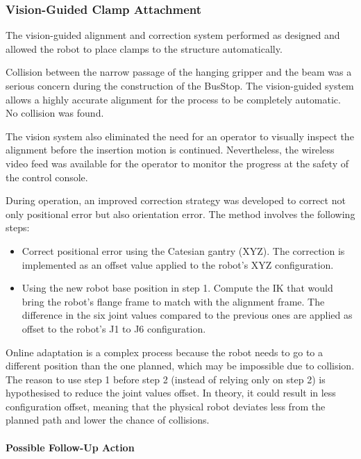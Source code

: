 \subsubsection{Vision-Guided Clamp Attachment}

The vision-guided alignment and correction system performed as designed and allowed the robot to place clamps to the structure automatically. 

Collision between the narrow passage of the hanging gripper and the beam was a serious concern during the construction of the BusStop. The vision-guided system allows a highly accurate alignment for the process to be completely automatic. No collision was found.

The vision system also eliminated the need for an operator to visually inspect the alignment before the insertion motion is continued. Nevertheless, the wireless video feed was available for the operator to monitor the progress at the safety of the control console.

During operation, an improved correction strategy was developed to correct not only positional error but also orientation error. The method involves the following steps:

\begin{itemize}
	\item Correct positional error using the Catesian gantry (XYZ). The correction is implemented as an offset value applied to the robot’s XYZ configuration.

	\item Using the new robot base position in step 1. Compute the IK that would bring the robot’s flange frame to match with the alignment frame. The difference in the six joint values compared to the previous ones are applied as offset to the robot’s J1 to J6 configuration.

\end{itemize}
Online adaptation is a complex process because the robot needs to go to a different position than the one planned, which may be impossible due to collision. The reason to use step 1 before step 2 (instead of relying only on step 2) is hypothesised to reduce the joint values offset. In theory, it could result in less configuration offset, meaning that the physical robot deviates less from the planned path and lower the chance of collisions. 

\paragraph{Possible Follow-Up Action}

